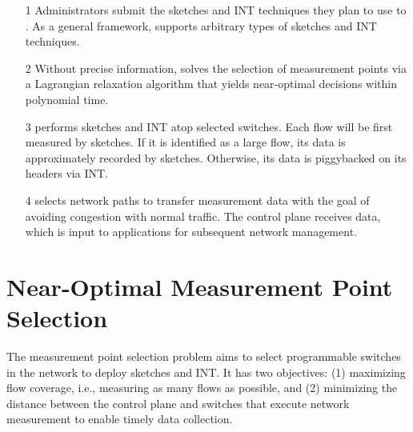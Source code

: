 \begin{itemize}[leftmargin=*]
%
    \item[1] Administrators submit the sketches and INT techniques they plan to use to \sysname. As a general framework, \sysname supports arbitrary types of sketches and INT techniques. 
%
    \item[2] Without precise information, \sysname solves the selection of measurement points via a Lagrangian relaxation algorithm that yields near-optimal decisions within polynomial time.
%
    \item[3] \sysname performs sketches and INT atop selected switches. Each flow will be first measured by sketches. If it is identified as a large flow, its data is approximately recorded by sketches. Otherwise, its data is piggybacked on its headers via INT. 
%
%
    \item[4] \sysname selects network paths to transfer measurement data with the goal of avoiding congestion with normal traffic. The control plane receives data, which is input to applications for subsequent network management. 
%
\end{itemize}



\section{Near-Optimal Measurement Point Selection}\label{selection}


 The measurement point selection problem aims to select programmable switches in the network to deploy sketches and INT. It has two objectives: (1) maximizing flow coverage, i.e., measuring as many flows as possible, and (2) minimizing the distance between the control plane and switches that execute network measurement to enable timely data collection.

